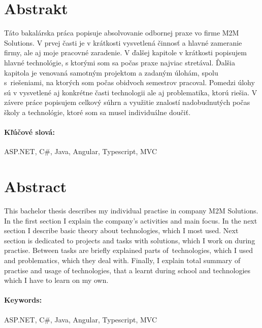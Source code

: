 \documentclass[11pt, oneside]{report}
\begin{document}
\newpage
\thispagestyle{empty}
\section*{Abstrakt}


Táto bakalárska práca popisuje absolvovanie odbornej praxe vo firme M2M Solutions. V prvej časti je v krátkosti   vysvetlená činnosť a hlavné zameranie firmy, ale aj moje pracovné zaradenie. V ďalšej kapitole  v krátkosti popisujem  hlavné technológie, s ktorými som sa počas praxe najviac stretával. Ďalšia  kapitola je venovaná samotným projektom a zadaným úlohám,  spolu s~riešeniami, na ktorých som  počas obidvoch semestrov pracoval. Pomedzi úlohy sú v vysvetlené aj konkrétne  časti technologii ale aj problematika, ktorú riešia. V závere práce popisujem  celkový súhrn  a využitie  znalostí  nadobudnutých počas školy a technológie, ktoré  som sa musel individuálne doučiť.



\paragraph*{Kľúčové slová:} ASP.NET, C\#, Java, Angular, Typescript, MVC

\paragraph*{}

\section*{Abstract}
This bachelor thesis describes my individual practise in company M2M Solutions. In the first section I explain the company's  activities and main focus. In the next section I describe basic theory about technologies, which I most used. Next section is dedicated to projects and tasks with solutions, which I work on during practise. Between tasks are briefly explained  parts of~technologies, which  I used and problematics, which they deal with. Finally, I explain total summary of practise and usage of technologies, that a learnt during school and technologies which I have to learn on my own.


\paragraph*{Keywords:}  ASP.NET, C\#, Java, Angular, Typescript, MVC
\end{document}
